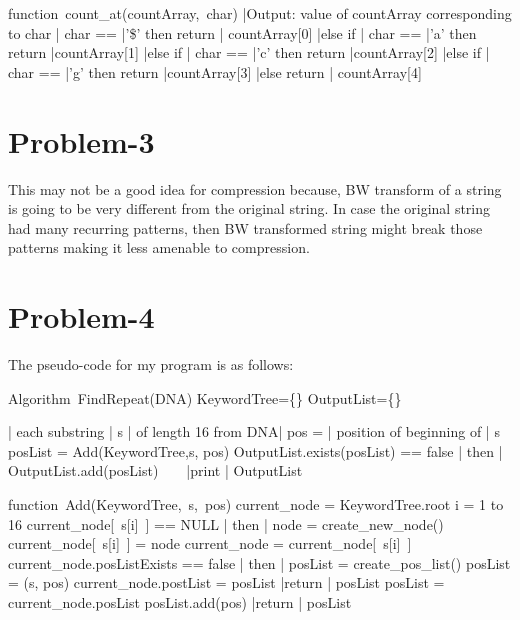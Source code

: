 \documentclass{article}
\begin{document}
\begin{program}
\mbox{function count\_at(countArray, char)}
|Output: value of countArray corresponding to char |
\BEGIN
	\IF char == |'\$' then return | countArray[0]
	|else if | char == |'a' then return |countArray[1]
	|else if | char == |'c' then return |countArray[2]
	|else if | char == |'g' then return |countArray[3]
	|else return | countArray[4]
	\FI
\END
\end{program}

\section{Problem-3}
This may not be a good idea for compression because, BW transform of a string is going to be very different from the original string. In case the original string had many recurring patterns, then BW transformed string might break those patterns making it less amenable to compression. 

\section{Problem-4}
The pseudo-code for my program is as follows:
\begin{program}
\mbox{Algorithm FindRepeat(DNA)}
\BEGIN
	KeywordTree=\{\}
	OutputList=\{\}
	
	\FOR | each substring | s | of length 16 from DNA| \DO
		pos = | position of beginning of | s
		posList = Add(KeywordTree,s, pos)
		\IF OutputList.exists(posList) == false | then |
			OutputList.add(posList) 
			\ 
			\  
		\FI
	\OD
	|print | OutputList
\END	
\end{program}

\begin{program}
\mbox{function Add(KeywordTree, s, pos)}
\BEGIN
	current\_node = KeywordTree.root
	\FOR i = 1 to 16 \DO
		\IF current\_node[\ s[i]\ ] == NULL | then |
			node = create_new_node()
			current\_node[\ s[i]\ ] = node
		\FI
		current\_node = current\_node[\ s[i]\ ] 
	\OD
	\IF current\_node.posListExists == false | then | 
		posList = create_pos_list()
		posList = (s, pos)
		current\_node.postList = posList
		|return | posList
	\ELSE
		posList = current\_node.posList
		posList.add(pos)
		|return | posList
	\FI	
\END
\end{program}
\end{document}

